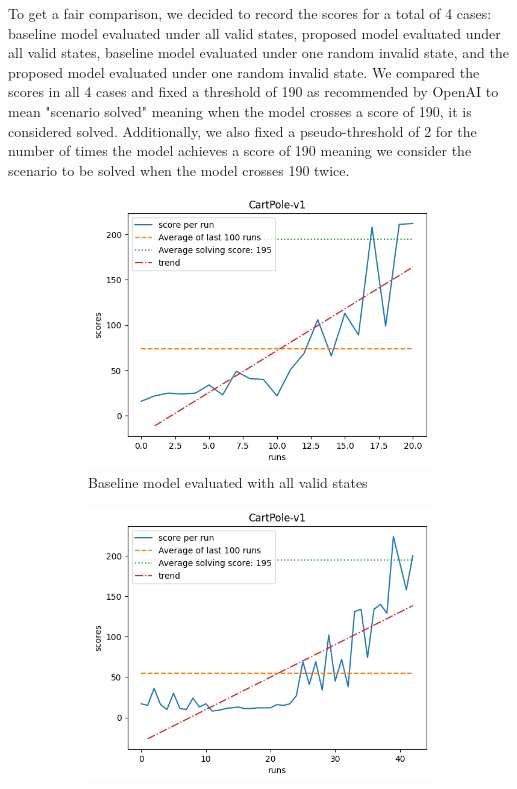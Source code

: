 \documentclass[acmsmall,review,authorversion]{acmart}
\begin{document}
To get a fair comparison, we decided to record the scores for a total of 4 cases: baseline model evaluated under all valid states, proposed model evaluated under all valid states, baseline model evaluated under one random invalid state, and the proposed model evaluated under one random invalid state. We compared the scores in all 4 cases and fixed a threshold of 190 as recommended by OpenAI to mean "scenario solved" meaning when the model crosses a score of 190, it is considered solved. Additionally, we also fixed a pseudo-threshold of 2 for the number of times the model achieves a score of 190 meaning we consider the scenario to be solved when the model crosses 190 twice.
  
    \begin{figure}[thb]
        \centering
        \begin{subfigure}{.5\textwidth}
          \centering
          \includegraphics[width=.8\linewidth]{assets/baseline_valid.png}
          \caption{Baseline model evaluated with all valid states}
          \label{fig:baseline_valid}
        \end{subfigure}%
        \begin{subfigure}{.5\textwidth}
          \centering
          \includegraphics[width=.8\linewidth]{assets/backtrack_valid.png}

\end{subfigure}
\end{figure}
\end{document}
